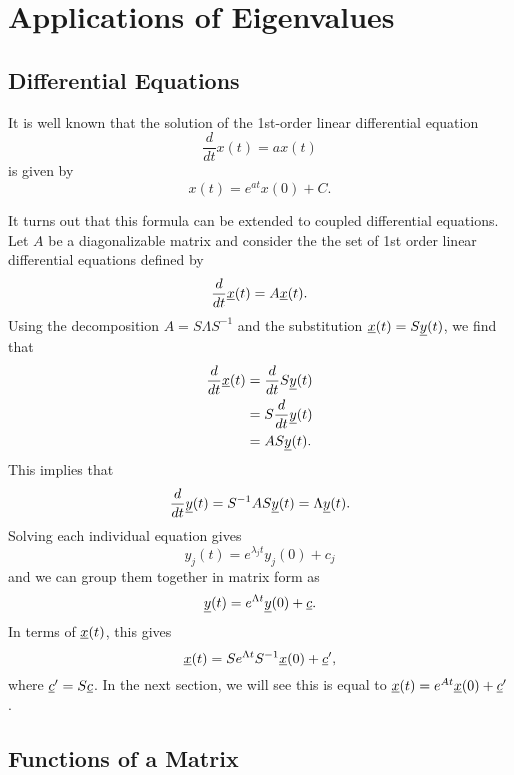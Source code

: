 \section{Applications of Eigenvalues}

\subsection{Differential Equations}
\label{sec:Differential_Equations}

It is well known that the solution of the 1st-order linear differential equation
\[ \frac{d}{dt} x(t) = a x(t) \]
is given by
\[ x(t) = e^{at} x(0) + C. \]

It turns out that this formula can be extended to coupled differential equations.
Let $A$ be a diagonalizable matrix and consider the the set of 1st order linear differential equations defined by
\[ \frac{d}{dt} \underline{x}(t) = A \underline{x}(t). \]
Using the decomposition $A = S \Lambda S^{-1}$ and the substitution $\underline{x}(t) = S \underline{y}(t)$, we find that
\begin{align*}
\frac{d}{dt} \underline{x}(t)
& = \frac{d}{dt} S \underline{y}(t) \\
& = S \frac{d}{dt} \underline{y}(t) \\
& = A S \underline{y}(t).
\end{align*}
This implies that
\[ \frac{d}{dt} \underline{y}(t) = S^{-1} A S \underline{y}(t) = \Lambda \underline{y}(t). \]
Solving each individual equation gives
\[ y_j (t) = e^{\lambda_j t} y_j (0) + c_j \]
and we can group them together in matrix form as
\[ \underline{y}(t) = e^{\Lambda t} \underline{y}(0) + \underline{c}. \]
In terms of $\underline{x}(t)$, this gives
\[ \underline{x}(t) = S e^{\Lambda t} S^{-1} \underline{x}(0) + \underline{c}', \]
where $\underline{c}' = S \underline{c}$.
In the next section, we will see this is equal to $ \underline{x}(t) = e^{A t} \underline{x}(0) + \underline{c}'$.

\subsection{Functions of a Matrix}

